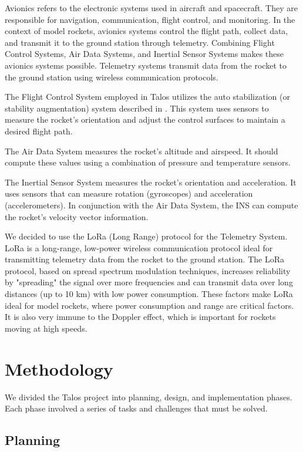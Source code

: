 \documentclass{article}
\begin{document}
Avionics refers to the electronic systems used in aircraft and spacecraft. They are responsible for navigation, communication, flight control, and monitoring. In the context of model rockets, avionics systems control the flight path, collect data, and transmit it to the ground station through telemetry. Combining Flight Control Systems, Air Data Systems, and Inertial Sensor Systems makes these avionics systems possible. Telemetry systems transmit data from the rocket to the ground station using wireless communication protocols.


The Flight Control System employed in Talos utilizes the auto stabilization (or stability augmentation) system described in \cite{Collinson_2012}. This system uses sensors to measure the rocket's orientation and adjust the control surfaces to maintain a desired flight path.


The Air Data System measures the rocket's altitude and airspeed. It should compute these values using a combination of pressure and temperature sensors.

The Inertial Sensor System measures the rocket's orientation and acceleration. It uses sensors that can measure rotation (gyroscopes) and acceleration (accelerometers). In conjunction with the Air Data System, the INS can compute the rocket's velocity vector information.

We decided to use the LoRa (Long Range) protocol for the Telemetry System. LoRa is a long-range, low-power wireless communication protocol ideal for transmitting telemetry data from the rocket to the ground station. The LoRa protocol, based on spread spectrum modulation techniques, increases reliability by "spreading" the signal over more frequencies and can transmit data over long distances (up to 10 km) with low power consumption. These factors make LoRa ideal for model rockets, where power consumption and range are critical factors. It is also very immune to the Doppler effect\cite{8723123}, which is important for rockets moving at high speeds.

\section{Methodology}

We divided the Talos project into planning, design, and implementation phases. Each phase involved a series of tasks and challenges that must be solved.

\subsection{Planning}
\end{document}
